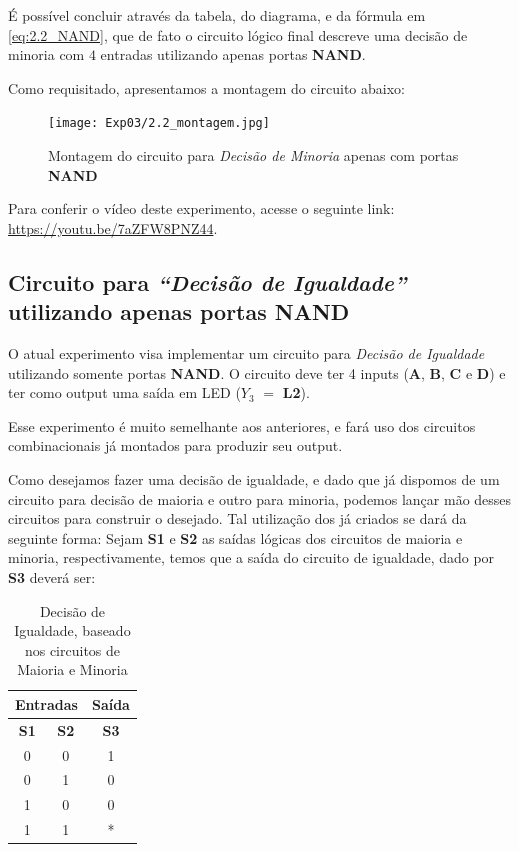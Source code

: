 \documentclass[12pt]{article}
\begin{document}
É possível concluir através da tabela, do diagrama, e da fórmula em
\ref{eq:2.2_NAND}, que de fato o circuito lógico final descreve uma decisão de
minoria com \(4\) entradas utilizando apenas portas \textbf{NAND}.

Como requisitado, apresentamos a montagem do circuito abaixo:

\begin{figure}[H]
    \centering
    \texttt{[image: Exp03/2.2\_montagem.jpg]}
    \caption{Montagem do circuito para \textit{Decisão de Minoria} apenas com portas \textbf{NAND}}
    \label{fig:decisao_minoria_montagem}
\end{figure}

Para conferir o vídeo deste experimento, acesse o seguinte link:
\href{https://youtu.be/7aZFW8PNZ44}{https://youtu.be/7aZFW8PNZ44}.
\\[2em]

\subsection{Circuito para \textit{``Decisão de Igualdade''} utilizando apenas portas \textbf{NAND}}\label{sec:decisao_igualdade}

O atual experimento visa implementar um circuito para \textit{Decisão de
Igualdade} utilizando somente portas \textbf{NAND}. O circuito deve ter 4 inputs
(\textbf{A}, \textbf{B}, \textbf{C} e \textbf{D}) e ter como output uma saída em
LED (\(Y_{3}\) \( = \) \textbf{L2}).

Esse experimento é muito semelhante aos anteriores, e fará uso dos circuitos
combinacionais já montados para produzir seu output.

Como desejamos fazer uma decisão de igualdade, e dado que já dispomos de um
circuito para decisão de maioria e outro para minoria, podemos lançar mão desses
circuitos para construir o desejado. Tal utilização dos já criados se dará da
seguinte forma: Sejam \textbf{S1} e \textbf{S2} as saídas lógicas dos circuitos
de maioria e minoria, respectivamente, temos que a saída do circuito de
igualdade, dado por \textbf{S3} deverá ser:

\begin{table}[H]
    \centering
    \caption{Decisão de Igualdade, baseado nos circuitos de Maioria e Minoria}
    \begin{tabular}{|c|c|c|}\hline
    \multicolumn{2}{|c|}{Entradas} & \multicolumn{1}{|c|}{Saída} \\\hline
    \textbf{S1} & \textbf{S2} & \textbf{S3} \\\hline
    0 & 0 & 1 \\\hline
    0 & 1 & 0 \\\hline
    1 & 0 & 0 \\\hline
    1 & 1 & * \\\hline
    \end{tabular}\label{tab:decisao_igualdade}
\end{table}
\end{document}
